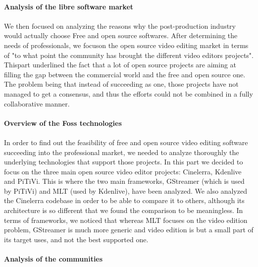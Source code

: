 \paragraph{Analysis of the libre software market}

\paragraph{}

We then focused on analyzing the reasons why the post-production industry
would actually choose Free and open source softwares. After determining the
needs of professionals, we focuson the open source video editing market in
terms of "to what point the community has brought the different video editors
projects". Thispart underlined the fact that a lot of open source projects are
aiming at filling the gap between the commercial world and the free and open
source one. The problem being that instead of succeeding as one, those
projects have not managed to get a consensus, and thus the efforts could
not be combined in a fully collaborative manner.

\paragraph{Overview of the Foss technologies}

\paragraph{}

In order to find out the feasibility of free and open source video editing
software succeeding into the professional market, we needed to analyze
thoroughly the underlying technologies that support those projects.
In this part we decided to focus on the three main open source video
editor projects: Cinelerra, Kdenlive and PiTiVi.  This is where the two
main frameworks, GStreamer (which is used by PiTiVi) and MLT (used by
Kdenlive), have been analyzed. We also analyzed the Cinelerra codebase
in order to be able to compare it to others, although its architecture
is so different that we found the comparison to be meaningless. In terms
of frameworks, we noticed that whereas MLT focuses on the video edition
problem, GStreamer is much more generic and video edition is but a small
part of its target uses, and not the best supported one.

\paragraph{Analysis of the communities}

